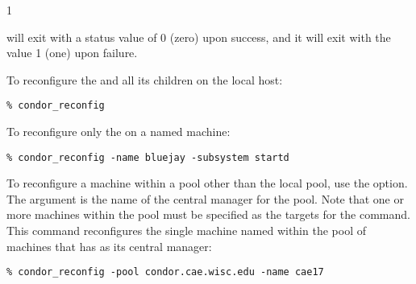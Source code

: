 \begin{ManPage}{\label{man-condor-reconfig}}{1}
\ExitStatus

 will exit with a status value of 0 (zero) upon success,
and it will exit with the value 1 (one) upon failure.

\Examples
To reconfigure the  and all its children
on the local host:
\begin{verbatim}
% condor_reconfig
\end{verbatim}

To reconfigure only the  on a named machine:
\begin{verbatim}
% condor_reconfig -name bluejay -subsystem startd
\end{verbatim}

To reconfigure a machine within a pool
other than the local pool, use the  option.
The argument is the name of the central manager for the pool.
Note that one or more machines within the pool must be
specified as the targets for the command.
This command reconfigures
the single machine named  within the
pool of machines that has  as
its central manager:
\begin{verbatim}
% condor_reconfig -pool condor.cae.wisc.edu -name cae17
\end{verbatim}

\end{ManPage}
